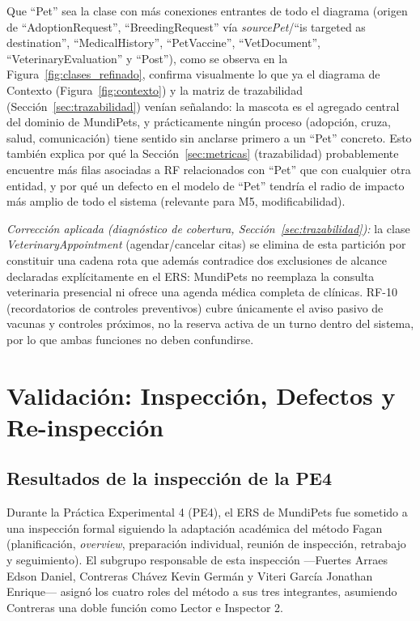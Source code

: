 \documentclass[journal,onecolumn]{IEEEtran}
\begin{document}
	Que ``Pet'' sea la clase con más conexiones entrantes de todo el
	diagrama (origen de ``AdoptionRequest'', ``BreedingRequest'' vía
	\textit{sourcePet}/``is targeted as destination'', ``MedicalHistory'',
	``PetVaccine'', ``VetDocument'',
	``VeterinaryEvaluation'' y ``Post''), como se observa en la
	Figura~\ref{fig:clases_refinado}, confirma visualmente lo que ya el
	diagrama de Contexto (Figura~\ref{fig:contexto}) y la matriz de
	trazabilidad (Sección~\ref{sec:trazabilidad}) venían señalando: la
	mascota es el agregado central del dominio de MundiPets, y prácticamente
	ningún proceso (adopción, cruza, salud, comunicación) tiene sentido sin
	anclarse primero a un ``Pet'' concreto. Esto también explica por qué la
	Sección~\ref{sec:metricas} (trazabilidad) probablemente encuentre más
	filas asociadas a RF relacionados con ``Pet'' que con cualquier otra
	entidad, y por qué un defecto en el modelo de ``Pet'' tendría el radio
	de impacto más amplio de todo el sistema (relevante para M5,
	modificabilidad).
	
	\noindent\textit{Corrección aplicada (diagnóstico de cobertura,
		Sección~\ref{sec:trazabilidad}):} la clase \textit{VeterinaryAppointment}
	(agendar/cancelar citas) se elimina de esta partición por constituir una
	cadena rota que además contradice dos exclusiones de alcance declaradas
	explícitamente en el ERS: MundiPets no reemplaza la consulta veterinaria
	presencial ni ofrece una agenda médica completa de clínicas. RF-10
	(recordatorios de controles preventivos) cubre únicamente el aviso
	pasivo de vacunas y controles próximos, no la reserva activa de un turno
	dentro del sistema, por lo que ambas funciones no deben confundirse.
	
	\newpage
	
\section{Validación: Inspección, Defectos y Re-inspección}

\subsection{Resultados de la inspección de la PE4}

Durante la Práctica Experimental 4 (PE4), el ERS de MundiPets fue sometido a una inspección formal siguiendo la adaptación académica del método Fagan (planificación, \emph{overview}, preparación individual, reunión de inspección, retrabajo y seguimiento). El subgrupo responsable de esta inspección ---Fuertes Arraes Edson Daniel, Contreras Chávez Kevin Germán y Viteri García Jonathan Enrique--- asignó los cuatro roles del método a sus tres integrantes, asumiendo Contreras una doble función como Lector e Inspector 2.
\end{document}
